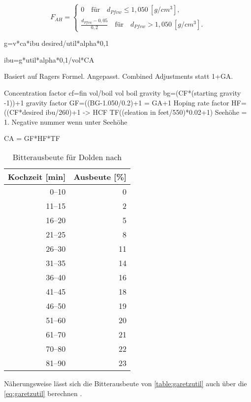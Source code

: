 \documentclass[a4paper,parskip=half]{scrartcl}
\newcommand{\uden}{\:[\mathit{g/cm^3}]}
\newcommand{\FAH}{F_{\mathit{AH}}}
\begin{document}
\begin{equation}
\FAH = \begin{cases}
0 \quad \text{für} \quad d_{\mathit{Pfvw}} \le 1,050 \uden, \\
\frac{d_{\mathit{Pfvw}} - 0,05}{0,2} \quad \text{für} \quad d_{\mathit{Pfvw}} > 1,050 \uden.
\end{cases}
\label{eq:ragerga}
\end{equation}


g=v*ca*ibu desired/util*alpha*0,1

ibu=g*util*alpha*0,1/vol*CA


Basiert auf Ragers Formel. Angepasst. Combined
Adjustments statt 1+GA.

Concentration factor
cf=fin vol/boil vol
boil gravity bg=(CF*(starting gravity -1))+1
gravity factor
GF=((BG-1.050/0.2)+1 = GA+1
Hoping rate factor
HF=((CF*desired ibu/260)+1  -> HCF
TF((eleation in feet/550)*0.02+1)
Seehöhe = 1. Negative nummer wenn unter Seehöhe

CA = GF*HF*TF

\begin{table}[H]
\centering
\begin{tabular}{rr}
\toprule
\multicolumn{1}{c}{\textbf{Kochzeit [min]}} & \multicolumn{1}{c}{\textbf{Ausbeute [\%]}} \\
\midrule
0–10            & 0 \\
11–15           & 2 \\
16–20           & 5 \\
21–25           & 8 \\
26–30           & 11 \\
31–35           & 14 \\
36–40           & 16 \\
41–45           & 18 \\
46–50           & 19 \\
51–60           & 20 \\
61–70           & 21 \\
70–80           & 22 \\
81–90           & 23 \\
\bottomrule
\end{tabular}
\caption{Bitterausbeute für Dolden nach \citeauthor{Garetz1994} \parencite[138]{Garetz1994}}
\label{table:garetzutil}
\end{table}

Näherungsweise lässt sich die Bitterausbeute von \autoref{table:garetzutil}
auch über die \autoref{eq:garetzutil} berechnen \parencite{Steinmeyer2021}. 
\end{document}
